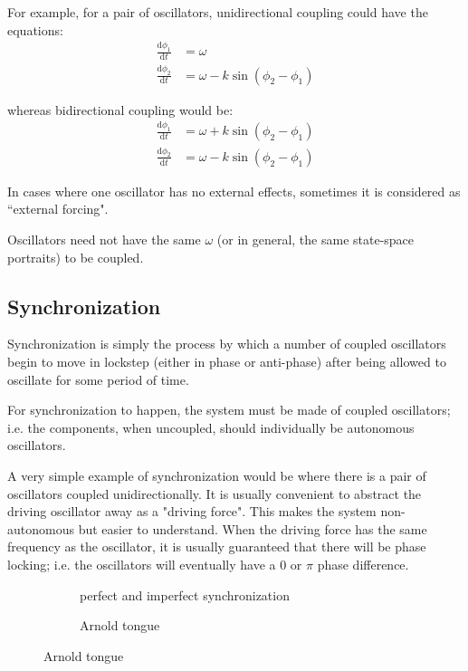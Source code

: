 \documentclass[12pt]{article}
\newcommand{\dt}[1]{\frac{\mathrm d #1}{\mathrm dt}}
\begin{document}
For example, for a pair of oscillators, unidirectional coupling could have the equations:
\begin{align*}
\dt{\phi_1} &= \omega \\
\dt{\phi_2} &= \omega - k\sin(\phi_2 - \phi_1)
\end{align*}

whereas bidirectional coupling would be:
\begin{align*}
\dt{\phi_1} &= \omega + k\sin(\phi_2 - \phi_1)\\
\dt{\phi_2} &= \omega - k\sin(\phi_2 - \phi_1)
\end{align*}

In cases where one oscillator has no external effects, sometimes it is considered as ``external forcing".


Oscillators need not have the same $\omega$ (or in general, the same state-space portraits) to be coupled.

\subsection{Synchronization}
Synchronization is simply the process by which a number of coupled oscillators begin to move in lockstep (either in phase or anti-phase) after being allowed to oscillate for some period of time.

For synchronization to happen, the system must be made of coupled oscillators; i.e. the components, when uncoupled, should individually be autonomous oscillators.

A very simple example of synchronization would be where there is a pair of oscillators coupled unidirectionally. It is usually convenient to abstract the driving oscillator away as a "driving force". This makes the system non-autonomous but easier to understand. When the driving force has the same frequency as the oscillator, it is usually guaranteed that there will be phase locking; i.e. the oscillators will eventually have a $0$ or $\pi$ phase difference.

\begin{figure}
\centering
\begin{subfigure}[b]{0.4\textwidth}

\caption{perfect and imperfect synchronization}\label{fig:detuning}
\end{subfigure}
\begin{subfigure}[b]{0.4\textwidth}

\caption{Arnold tongue}\label{fig:arnold}
\end{subfigure}
\end{figure}
\end{document}
